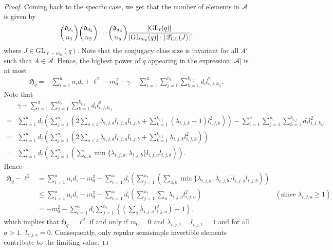 \documentclass[11pt,twoside]{amsart}
\newcommand{\GL}{\mathrm{GL}}
\newcommand{\Zen}{\mathscr{Z}}
\renewcommand{\d}{\mathfrak d}
\theoremstyle{definition} %
\begin{document}
\begin{proof}
    Coming back to the specific case, we get that the number of elements in $\mathscr A$ is given by
    \begin{align*}
        \dbinom{\d_{d_1}}{n_1}\dbinom{\d_{d_2}}{n_2}\cdots\dbinom{\d_{d_u}}{n_u}\dfrac{|\GL_\ell(q)|}{|\GL_{m_0}(q)|\cdot|\Zen_{\GL}(J)|},
    \end{align*}
    where $J\in \GL_{\ell-m_0}(q)$.
    Note that the conjugacy class size is invariant for all $A'$ such that $A\in \mathscr A$.
    Hence, the highest power of $q$ appearing in the expression $|\mathscr A|$ is at most
    \begin{align*}
        \mathfrak H_q=&\sum
        \limits_{i=1}^{u} n_id_i 
        +\ell^2-m^2_0-\gamma -\sum\limits_{i=1}^u\sum\limits_{j=1}^{n_i}\sum\limits_{k=1}^{k_{i,j}}
        d_i
        l_{i,j,k_{ij}}^2.
    \end{align*}
    Note that 
    \begin{align*}
        &\gamma+\sum\limits_{i=1}^u\sum\limits_{j=1}^{n_i}\sum\limits_{k=1}^{k_{i,j}}
        d_i
        l_{i,j,k_{ij}}^2\\
        =&\sum\limits_{i=1}^{u}d_i\left(\sum\limits_{j=1}^{n_i}\left(2\sum\limits_{a<b}\lambda_{i,j,a}l_{i,j,a}l_{i,j,b}+\sum\limits_{k=1}^{k_{i,j}}(\lambda_{i,j,k}-1)l_{i,j,k}^2\right)\right)
        -
        \sum\limits_{i=1}^u\sum\limits_{j=1}^{n_i}\sum\limits_{k=1}^{k_{i,j}}
        d_i
        l_{i,j,k_{ij}}^2\\
        =&\sum\limits_{i=1}^{u}d_i\left(\sum\limits_{j=1}^{n_i}\left(2\sum\limits_{a<b}\lambda_{i,j,a}l_{i,j,a}l_{i,j,b}+\sum\limits_{k=1}^{k_{i,j}}\lambda_{i,j,k}l_{i,j,k}^2\right)\right)\\
        =&\sum\limits_{i=1}^{u}d_i\left(\sum\limits_{j=1}^{n_i}\left(\sum\limits_{a,b}\operatorname{min}\{\lambda_{i,j,a},\lambda_{i,j,b}\}l_{i,j,a}l_{i,j,b}\right)\right).
    \end{align*}
    Hence 
    \begin{align*}
        \mathfrak H_q-\ell^2&=\sum\limits_{i=1}^{u}n_id_i-m_0^2-\sum\limits_{i=1}^{u}d_i\left(\sum\limits_{j=1}^{n_i}\left(\sum\limits_{a,b}\operatorname{min}\{\lambda_{i,j,a},\lambda_{i,j,b}\}l_{i,j,a}l_{i,j,b}\right)\right)\\
        &\leq \sum\limits_{i=1}^u n_id_i-m_0^2-\sum\limits_{i=1}^u d_i\left(\sum\limits_{j=1}^{n_i}\sum\limits_{a}  \lambda_{i,j,a}l_{i,j,a}^2\right)&(\text{since }\lambda_{i,j,a}\geq 1)\\
        &=-m_0^2-\sum\limits_{i=1}^u d_i\sum\limits_{j=1}^{n_i}\left\{\left(\sum\limits _{a}\lambda_{i,j,a}l_{i,j,a}^2\right)-1\right\},
    \end{align*}
    which implies that $\mathfrak H_q=\ell^2$ if and only if $m_0=0$ and $\lambda_{i,j,1}=l_{i,j,1}=1$ and for all $a>1,$ $l_{i,j,a}=0$.
    Consequently, only regular semisimple invertible elements contribute to the limiting value.
    \end{proof}
\end{document}
